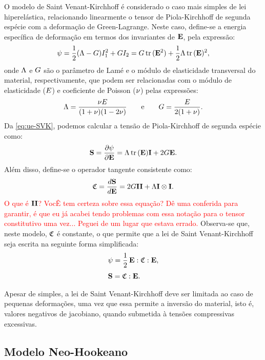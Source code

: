 \documentclass[Tese.tex]{subfiles}
\begin{document}
O modelo de Saint Venant-Kirchhoff é considerado o caso mais simples de lei hiperelástica, relacionando linearmente o tensor de Piola-Kirchhoff de segunda espécie com a deformação de Green-Lagrange. Neste caso, define-se a energia específica de deformação em termos dos invariantes de $\mathbf{E}$, pela expressão:
\begin{equation}\label{eq:ue-SVK}
\psi = \dfrac{1}{2}(\Lambda-G)I_1^2 + G I_2 = G \,\text{tr}\,(\mathbf{E}^2)+\dfrac{1}{2}\Lambda\,\text{tr}\,(\mathbf{E})^2,
\end{equation}
onde $\Lambda$ e $G$ são o parâmetro de Lamé e o módulo de elasticidade transversal do material, respectivamente, que podem ser relacionadas com o módulo de elasticidade ($E$) e coeficiente de Poisson ($\nu$) pelas expressões:
\begin{equation}
\Lambda = \dfrac{\nu E}{(1+\nu)(1-2\nu)}
\qquad\text{e}\qquad
G = \dfrac{E}{2(1+\nu)}. \label{eq:lame}
\end{equation}
Da \cref{eq:ue-SVK}, podemos calcular a tensão de Piola-Kirchhoff de segunda espécie como:
\begin{equation}
\mathbf{S} = \dfrac{\partial \psi}{\partial \mathbf{E}} = \Lambda\,\text{tr}\,(\mathbf{E})\mathbf{I} + 2G\mathbf{E}.
\end{equation}
Além disso, define-se o operador tangente consistente como:
\begin{equation}\label{eq:C-SVK}
\mathfrak{C} = \dfrac{d \mathbf{S}}{d \mathbf{E}} = 2G\mathbf{II} + \Lambda\mathbf{I}\otimes\mathbf{I}.
\end{equation}
\textcolor{red}{O que é $\mathbf{II}$? VocÊ tem certeza sobre essa equação? Dê uma conferida para garantir, é que eu já acabei tendo problemas com essa notação para o tensor constitutivo uma vez... Peguei de um lugar que estava errado.}
Observa-se que, neste modelo, $\mathfrak{C}$ é constante, o que permite que a lei de Saint Venant-Kirchhoff seja escrita na seguinte forma simplificada:
\begin{align}
&\psi = \dfrac{1}{2}\,\mathbf{E}:\mathfrak{C}:\mathbf{E},\\[0.1cm]
&\mathbf{S} = \mathfrak{C}:\mathbf{E}.
\end{align}

Apesar de simples, a lei de Saint Venant-Kirchhoff deve ser limitada ao caso de pequenas deformações, uma vez que essa permite a inversão do material, isto é, valores negativos de jacobiano, quando submetida à tensões compressivas excessivas.

\subsection{Modelo Neo-Hookeano}\label{subsec:neo-hoookean}
\end{document}
